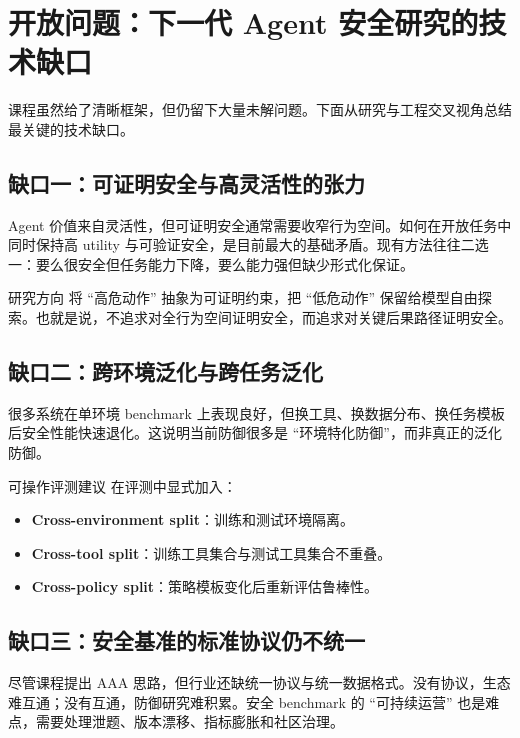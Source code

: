 \section{开放问题：下一代 Agent 安全研究的技术缺口}

课程虽然给了清晰框架，但仍留下大量未解问题。下面从研究与工程交叉视角总结最关键的技术缺口。

\subsection{缺口一：可证明安全与高灵活性的张力}
Agent 价值来自灵活性，但可证明安全通常需要收窄行为空间。如何在开放任务中同时保持高 utility 与可验证安全，是目前最大的基础矛盾。现有方法往往二选一：要么很安全但任务能力下降，要么能力强但缺少形式化保证。

\begin{importantbox}{研究方向}
将 ``高危动作'' 抽象为可证明约束，把 ``低危动作'' 保留给模型自由探索。也就是说，不追求对全行为空间证明安全，而追求对关键后果路径证明安全。
\end{importantbox}

\subsection{缺口二：跨环境泛化与跨任务泛化}
很多系统在单环境 benchmark 上表现良好，但换工具、换数据分布、换任务模板后安全性能快速退化。这说明当前防御很多是 ``环境特化防御''，而非真正的泛化防御。

\begin{knowledgebox}{可操作评测建议}
在评测中显式加入：
\begin{itemize}
    \item \textbf{Cross-environment split}：训练和测试环境隔离。
    \item \textbf{Cross-tool split}：训练工具集合与测试工具集合不重叠。
    \item \textbf{Cross-policy split}：策略模板变化后重新评估鲁棒性。
\end{itemize}
\end{knowledgebox}

\subsection{缺口三：安全基准的标准协议仍不统一}
尽管课程提出 AAA 思路，但行业还缺统一协议与统一数据格式。没有协议，生态难互通；没有互通，防御研究难积累。安全 benchmark 的 ``可持续运营'' 也是难点，需要处理泄题、版本漂移、指标膨胀和社区治理。

